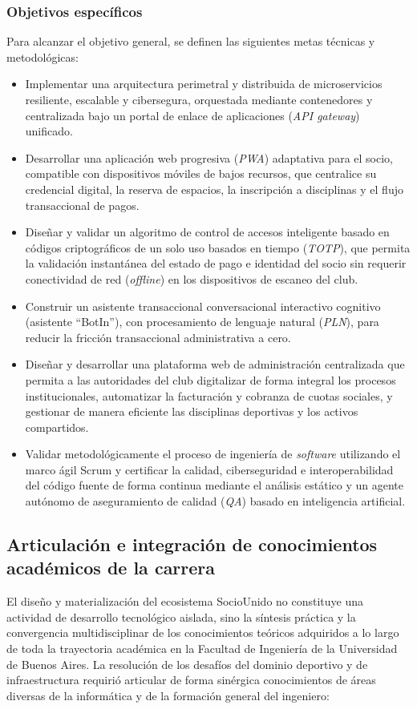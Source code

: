 \documentclass[conference, a4paper]{IEEEtran}
\begin{document}
\subsubsection{Objetivos espec\'ificos}
Para alcanzar el objetivo general, se definen las siguientes metas t\'ecnicas y metodol\'ogicas:
\begin{itemize}
    \item Implementar una arquitectura perimetral y distribuida de microservicios resiliente, escalable y cibersegura, orquestada mediante contenedores y centralizada bajo un portal de enlace de aplicaciones (\textit{API gateway}) unificado.
    \item Desarrollar una aplicaci\'on web progresiva (\textit{PWA}) adaptativa para el socio, compatible con dispositivos m\'oviles de bajos recursos, que centralice su credencial digital, la reserva de espacios, la inscripci\'on a disciplinas y el flujo transaccional de pagos.
    \item Dise\~nar y validar un algoritmo de control de accesos inteligente basado en c\'odigos criptogr\'aficos de un solo uso basados en tiempo (\textit{TOTP}), que permita la validaci\'on instant\'anea del estado de pago e identidad del socio sin requerir conectividad de red (\textit{offline}) en los dispositivos de escaneo del club.
    \item Construir un asistente transaccional conversacional interactivo cognitivo (asistente ``BotIn''), con procesamiento de lenguaje natural (\textit{PLN}), para reducir la fricci\'on transaccional administrativa a cero.
    \item Dise\~nar y desarrollar una plataforma web de administraci\'on centralizada que permita a las autoridades del club digitalizar de forma integral los procesos institucionales, automatizar la facturaci\'on y cobranza de cuotas sociales, y gestionar de manera eficiente las disciplinas deportivas y los activos compartidos.
    \item Validar metodol\'ogicamente el proceso de ingenier\'ia de \textit{software} utilizando el marco \'agil Scrum y certificar la calidad, ciberseguridad e interoperabilidad del c\'odigo fuente de forma continua mediante el an\'alisis est\'atico y un agente aut\'onomo de aseguramiento de calidad (\textit{QA}) basado en inteligencia artificial.
\end{itemize}

\subsection{Articulaci\'on e integraci\'on de conocimientos acad\'emicos de la carrera}
El dise\~no y materializaci\'on del ecosistema SocioUnido no constituye una actividad de desarrollo tecnol\'ogico aislada, sino la s\'intesis pr\'actica y la convergencia multidisciplinar de los conocimientos te\'oricos adquiridos a lo largo de toda la trayectoria acad\'emica en la Facultad de Ingenier\'ia de la Universidad de Buenos Aires. La resoluci\'on de los desaf\'ios del dominio deportivo y de infraestructura requiri\'o articular de forma sin\'ergica conocimientos de \'areas diversas de la inform\'atica y de la formaci\'on general del ingeniero:
\end{document}
